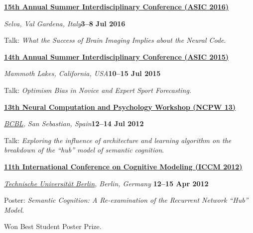 \documentclass[10pt]{article}
\newenvironment{outerlist}[1][\enskip\textbullet]%
        {\begin{itemize}[#1]}{\end{itemize}%
         \vspace{-.6\baselineskip}}
\newenvironment{innerlist}[1][\enskip\textbullet]%
        {\begin{compactitem}[#1]}{\end{compactitem}}
\begin{document}
\textbf{\href{http://www.cogs.indiana.edu/asic/2016/index.shtml}{15th Annual Summer Interdisciplinary Conference (ASIC 2016)}}
\begin{outerlist}
  \item[] \textit{Selva, Val Gardena, Italy}\hfill\textbf{3--8 Jul 2016}
  \begin{innerlist}
    \item Talk: \textit{What the Success of Brain Imaging Implies about the Neural Code}.
  \end{innerlist}
\end{outerlist}
\vspace{8pt}

\textbf{\href{http://www.cogs.indiana.edu/asic/2015/index.shtml}{14th Annual Summer Interdisciplinary Conference (ASIC 2015)}}
\begin{outerlist}
  \item[] \textit{Mammoth Lakes, California, USA}\hfill\textbf{10--15 Jul 2015}
  \begin{innerlist}
    \item Talk: \textit{Optimism Bias in Novice and Expert Sport Forecasting}.
  \end{innerlist}
\end{outerlist}
\vspace{8pt}

\textbf{\href{http://www.bcbl.eu/events/ncpw13/}{13th Neural Computation and Psychology Workshop (NCPW 13)}}
\begin{outerlist}
  \item[] \textit{\href{http://www.bcbl.eu/}{BCBL}, San Sebastian, Spain}\hfill\textbf{12--14 Jul 2012}
  \begin{innerlist}
    \item Talk: \textit{Exploring the influence of architecture and learning algorithm on the breakdown of the ``hub'' model of semantic cognition}.
  \end{innerlist}
\end{outerlist}
\vspace{8pt}

\textbf{\href{http://iccm-conference.org/2012/}{11th International Conference on Cognitive Modeling (ICCM 2012)}}
\begin{outerlist}
  \item[] \textit{\href{http://www.tu-berlin.de/menue/home/parameter/en/}{Technische Universit\"{a}t Berlin}, Berlin, Germany}
  \hfill \textbf{12--15 Apr 2012}
  \begin{innerlist}
    \item Poster: \textit{Semantic Cognition: A Re-examination of the Recurrent Network ``Hub'' Model}.
    \item Won Best Student Poster Prize.
  \end{innerlist}
\end{outerlist}
\end{document}
